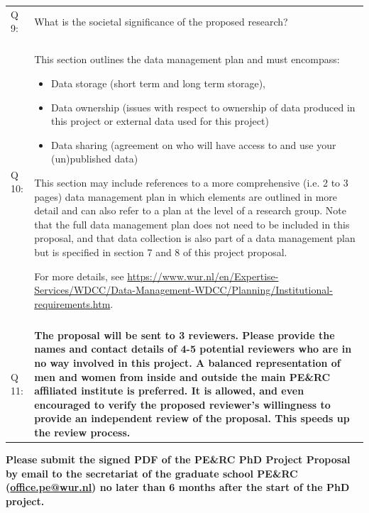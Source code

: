\documentclass[10pt]{article}
\begin{document}
\begin{tabularx}{\textwidth}[]{p{1.5cm}X}
Q 9: & What is the societal significance of the proposed research?\\ \\

Q 10: & This section outlines the data management plan and must encompass:
\begin{itemize}[nosep]
 \item Data storage (short term and long term storage), 
 \item Data ownership (issues with respect to ownership of data produced in this project or external data used for this project)
 \item Data sharing (agreement on who will have access to and use your (un)published data)
\end{itemize}
This section may include references to a more comprehensive (i.e. 2 to 3 pages) data management plan in which elements are outlined in more detail and can also refer to a plan at the level of a research group. Note that the full data management plan does not need to be included in this proposal, and that data collection is also part of a data management plan but is specified in section 7 and 8 of this project proposal.

For more details, see \url{https://www.wur.nl/en/Expertise-Services/WDCC/Data-Management-WDCC/Planning/Institutional-requirements.htm}.\\ \\

Q 11: & \textbf{The proposal will be sent to 3 reviewers. Please provide the names and contact details of 4-5 potential reviewers who are in no way involved in this project. A balanced representation of men and women from inside and outside the main PE\&RC affiliated institute is preferred. It is allowed, and even encouraged to verify the proposed reviewer’s willingness to provide an independent review of the proposal. This speeds up the review process.}
\end{tabularx}

\vfill

\textbf{Please submit the signed PDF of the PE\&RC PhD Project Proposal by email to the secretariat of the graduate school PE\&RC (\href{mailto:office.pe@wur.nl}{office.pe@wur.nl}) no later than 6 months after the start of the PhD project.}

\vfill
\end{document}

